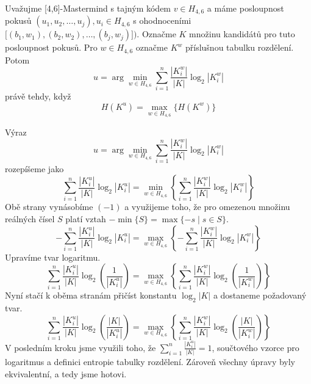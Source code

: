 \begin{veta} \label{ekvivalencemaxentropy}
    Uvažujme [4,6]-Mastermind s tajným kódem $v\in H_{4,6}$ a máme posloupnost pokusů $\left(u_1, u_2, \dots, u_j\right), u_i \in H_{4,6}$ s ohodnoceními $\lbrack (b_1,w_1) , (b_2,w_2), \dots, (b_j,w_j)\rbrack)$. Označme $K$ množinu kandidátů pro tuto posloupnost pokusů. Pro $w \in H_{4,6}$ označme $K^w$ příslušnou tabulku rozdělení. Potom 
    \[u = \arg\min_{w \in H_{4,6}} \sum_{i=1}^n \frac{|K^w_i|}{|K|}\log_2|K^w_i|\]
    právě tehdy, když 
    \[H(K^u) = \max_{w \in H_{4,6}} \{ H(K^w) \}\]
    
\end{veta}
\begin{dukaz}
     Výraz 
  \[
      u = \arg\min_{w \in H_{4,6}} \sum_{i=1}^n \frac{|K^w_i|}{|K|}\log_2|K^w_i| 
      \]
      rozepíšeme jako
\[
      \sum_{i=1}^{n} \frac{|K^u_i|}{|K|} \log_2|K^u_i| 
      = \min_{w \in H_{4,6}} \left\{ \sum_{i=1}^n \frac{|K^w_i|}{|K|}\log_2|K^w_i| \right\}  
      \]
      Obě strany vynásobíme $(-1)$ a využijeme toho, že pro omezenou množinu reálných čísel $S$ platí vztah $-\min\{S\} = \max\{-s \mid s \in S\}$.
\[
      -\sum_{i=1}^n \frac{|K^u_i|}{|K|}\log_2|K^u_i| 
      = \max_{w \in H_{4,6}} \left\{ -\sum_{i=1}^n \frac{|K^w_i|}{|K|}\log_2|K^w_i| \right\}  
\]
Upravíme tvar logaritmu.
\[
      \sum_{i=1}^n \frac{|K^u_i|}{|K|}\log_2\left( \frac{1}{|K^u_i|} \right) 
      = \max_{w \in H_{4,6}} \left\{ \sum_{i=1}^n \frac{|K^w_i|}{|K|}\log_2\left( \frac{1}{|K^w_i|} \right) \right\} 
\]
Nyní stačí k oběma stranám přičíst konstantu $\log_2|K|$ a dostaneme požadovaný tvar. 
\[
      \sum_{i=1}^n \frac{|K^u_i|}{|K|}\log_2\left( \frac{|K|}{|K^u_i|} \right) 
      = \max_{w \in H_{4,6}} \left\{ \sum_{i=1}^n \frac{|K^w_i|}{|K|}\log_2\left( \frac{|K|}{|K^w_i|} \right) \right\} 
\]
V posledním kroku jsme využili toho, že $\sum_{i=1}^n \frac{|K^u_i|}{|K|} = 1$, součtového vzorce pro logaritmus a definici entropie tabulky rozdělení. Zároveň všechny úpravy byly ekvivalentní, a tedy jsme hotovi.
\end{dukaz}








